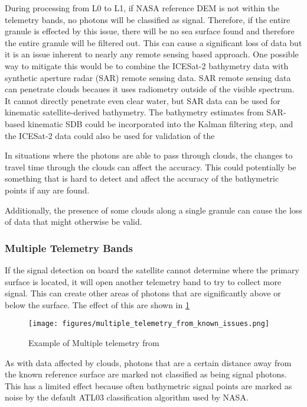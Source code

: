 During processing from L0 to L1, if NASA reference DEM is not within the telemetry bands, no photons will be classified as signal. Therefore, if the entire granule is effected by this issue, there will be no sea surface found and therefore the entire granule will be filtered out. This can cause a significant loss of data but it is an issue inherent to nearly any remote sensing based approach. One possible way to mitigate this would be to combine the ICESat-2 bathymetry data with synthetic aperture radar (SAR) remote sensing data. SAR remote sensing data can penetrate clouds becaues it uses radiometry outside of the visible spectrum. It cannot directly penetrate even clear water, but SAR data can be used for kinematic satellite-derived bathymetry. The bathymetry estimates from SAR-based kinematic SDB could be incorporated into the Kalman filtering step, and the ICESat-2 data could also be used for validation of the 

In situations where the photons are able to pass through clouds, the changes to travel time through the clouds can affect the accuracy. This could potentially be something that is hard to detect and affect the accuracy of the bathymetric points if any are found.

Additionally, the presence of some clouds along a single granule can cause the loss of data that might otherwise be valid.  

\subsubsection{Multiple Telemetry Bands}

If the signal detection on board the satellite cannot determine where the primary surface is located, it will open another telemetry band to try to collect more signal. This can create other areas of photons that are significantly above or below the surface. The effect of this are shown in \ref{fig:multiple_tel_bands}

\begin{figure}[h!]
    \centering
    \texttt{[image: figures/multiple\_telemetry\_from\_known\_issues.png]}
    \caption{Example of Multiple telemetry from \cite{atl03knownissues}}
    \label{fig:multiple_tel_bands}
\end{figure}

As with data affected by clouds, photons that are a certain distance away from the known reference surface are marked not classified as being signal photons. This has a limited effect because often bathymetric signal points are marked as noise by the default ATL03 classification algorithm used by NASA. 


